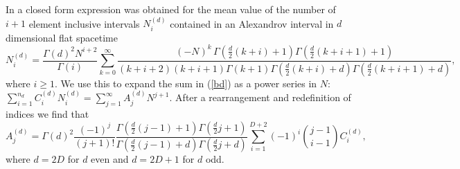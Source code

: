 \documentclass[12pt]{article}
\begin{document}
In \cite{Glaser_Sumati:Locality_in_Causal_Set} a closed form expression was obtained for the mean value of the number of $i+1$ element inclusive intervals $N_i^{(d)}$ contained in an Alexandrov interval in $d$ dimensional flat spacetime 
\begin{equation} N_i^{ (d)}= \frac{\Gamma\left (d\right)^2 N^{i+2}}{\Gamma\left (i\right)} \sum_{k=0}^\infty \frac{ (-N)^k\,\Gamma\left (\frac{d}2 (k+i)+1\right)  \Gamma\left (\frac{d}2 (k+i+1)+1\right)}{ (k+i+2)  (k+i+1) \Gamma\left (k+1\right)\Gamma\left (\frac{d}2 (k+i) +d\right) \Gamma\left (\frac{d}2 (k+i+1)+d\right)},\nonumber
\end{equation} 
where $i \geq 1$.  We use this to expand the sum in (\ref{bd}) as a power series in $N$: $\sum_{i=1}^{n_d}C_i^{ (d)} N_i^{ (d)} = \sum_{j=1}^\infty A_j^{ (d)}  N^{j+1}$.  After a rearrangement and redefinition of indices we find that 
\begin{equation}
 A_j^{ (d)} = \Gamma\left (d\right)^2\frac{ (-1)^j}{ (j+1)!}\frac{\Gamma\left (\frac{d}{2} (j-1)+1\right)\Gamma\left (\frac{d}{2}j+1\right)}{\Gamma\left (\frac{d}{2} (j-1)+d\right) \Gamma\left (\frac{d}{2}j+d\right)}\sum_{i=1}^{D+2} (-1)^i \binom{j-1}{i-1}  C_i^{ (d)}, 
\end{equation} 
where $d=2D$ for $d$ even and $d=2D+1$ for $d$ odd.   
\end{document}
